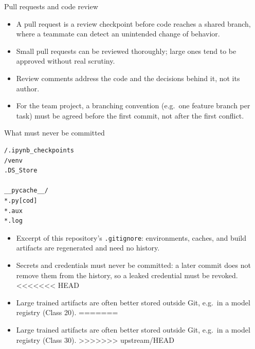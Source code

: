 \begin{frame}{Pull requests and code review}
\begin{itemize}
\item A pull request is a review checkpoint before code reaches a shared branch, where a teammate can detect an unintended change of behavior.
\item Small pull requests can be reviewed thoroughly; large ones tend to be approved without real scrutiny.
\item Review comments address the code and the decisions behind it, not its author.
\item For the team project, a branching convention (e.g.\ one feature branch per task) must be agreed before the first commit, not after the first conflict.
\end{itemize}
\coursefooter
\end{frame}

\begin{frame}[fragile]{What must never be committed}
\begin{lstlisting}[style=coursepython,language=bash]
/.ipynb_checkpoints
/venv
.DS_Store

__pycache__/
*.py[cod]
*.aux
*.log
\end{lstlisting}
\begin{itemize}
\item Excerpt of this repository's \texttt{.gitignore}: environments, caches, and build artifacts are regenerated and need no history.
\item Secrets and credentials must never be committed: a later commit does not remove them from the history, so a leaked credential must be revoked.
<<<<<<< HEAD
\item Large trained artifacts are often better stored outside Git, e.g.\ in a model registry (Class 20).
=======
\item Large trained artifacts are often better stored outside Git, e.g.\ in a model registry (Class 30).
>>>>>>> upstream/HEAD
\end{itemize}
\coursefooter
\end{frame}

